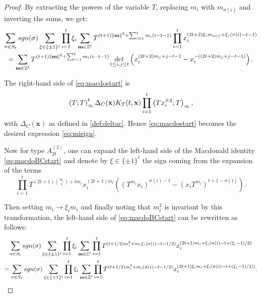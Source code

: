 \documentclass[10pt,a4paper]{amsart}
\def\bbbz{\mathbb Z}
\def\det{{\rm det}}
\def\sgn{{\rm sgn}}
\begin{document}
\begin{proof}
\noindent By extracting the powers of the variable $T$, replacing $m_i$ with $m_{\sigma(i)}$ and inverting the sums, we get:
\begin{multline*}
\sum_{\sigma\in S_t}\sgn(\sigma) \sum_{\xi\in\lbrace \pm 1\rbrace^t}\prod_{i=1}^t \xi_i\sum_{\mathbf{m}\in\bbbz^t}T^{(t+1)\lVert \mathbf{m}\rVert^2+\sum_{i=1}^t m_i(i-t-1)}\prod_{i=1}^t   x_i^{(2t+2)\xi_im_{\sigma(i)}+\xi_i(\sigma(i)-t-1)}\\
=\sum_{\mathbf{m}\in\bbbz^t}T^{(t+1)\lVert \mathbf{m}\rVert^2+\sum_{i=1}^tm_i(i-t-1)}\underset{1\le i,j\le t}{\det}\left(x_i^{(2t+2)m_j+j-t-1}-x_i^{-((2t+2)m_j+j-t-1)}\right).
\end{multline*}


\noindent The right-hand side of \eqref{eq:macdostart} is
\begin{equation*}
\left(T;T\right)_\infty^t \Delta_C(\mathbf{x})K_T(t,{\bf x})\prod_{i=1}^t \left(Tx_i^{\pm 2};T\right)_\infty,
\end{equation*}
%
with $\Delta_C(\mathbf{x})$ as defined in \eqref{def:deltac}.
Hence \eqref{eq:macdostart} becomes the desired expression \eqref{eq:misign}.
%

Now for type $A_{2t}^{(2)}$, one can expand the left-hand side of the Macdonald identity \eqref{eq:macdoBCstart} and denote by $\xi\in\lbrace \pm 1\rbrace^t$ the sign coming from the expansion of the terms $$\prod_{i=1}^t T^{(2t+1)\binom{m_i}{2}+t m_i}x_i^{(2t+1)m_i}\left((T^{m_i}x_i)^{\sigma(i)-t}-(x_iT^{m_i})^{t+1-\sigma(i)}\right).$$

\noindent Then setting $m_i\to \xi_i m_i$ and finally noting that $m_i^2$ is invariant by this transformation, the left-hand side of \eqref{eq:macdoBCstart} can be rewritten as follows:
\begin{multline*}
\sum_{\sigma\in S_t}\sgn(\sigma) \sum_{\xi\in\lbrace \pm 1\rbrace^t}\prod_{i=1}^t \xi_i \sum_{\mathbf{m}\in\bbbz^t}\prod_{i=1}^t T^{(t+1/2)m_i^2+m_i \xi_i(\sigma(i)-t-1/2)} x_i^{(2t+1)m_i+\xi_i(\sigma(i)-t+(\xi_i-1)/2)}\\
=\sum_{\sigma\in S_t}\sgn(\sigma) \sum_{\xi\in\lbrace \pm 1\rbrace^t}\prod_{i=1}^t \xi_i\sum_{\mathbf{m}\in\bbbz^t}\prod_{i=1}^t  T^{(t+1/2)m_i^2+m_i(\sigma(i)-t-1/2)} x_i^{(2t+1)\xi_im_i+\xi_i(\sigma(i)-t+(\xi_i-1)/2))}.
\end{multline*}





\end{proof}
\end{document}
